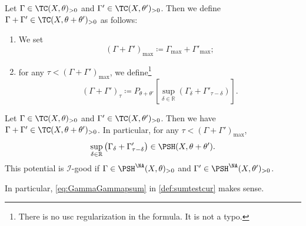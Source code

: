 \begin{definition}\label{def:sumtestcur}
    Let $\Gamma \in \TC(X,\theta)_{>0}$ and $\Gamma' \in \TC(X,\theta')_{>0}$. Then we define $\Gamma+\Gamma'\in \TC(X,\theta+\theta')_{>0}$ as follows:
    \begin{enumerate}
        \item\label{itm:def:sumtestcur:1} We set
        \[
        (\Gamma+\Gamma')_{\max}\coloneqq \Gamma_{\max}+\Gamma'_{\max};
        \]
        \item\label{itm:def:sumtestcur:2} for any $\tau<(\Gamma+\Gamma')_{\max}$, we define\footnote{There is no usc regularization in the formula. It is not a typo.}
        \begin{equation}\label{eq:GammaGammapsum}
            (\Gamma+\Gamma')_{\tau }\coloneqq P_{\theta+\theta'}\left[\sup_{\delta\in \mathbb{R}} \left(\Gamma_\delta+\Gamma'_{\tau-\delta}\right)\right].
        \end{equation}
    \end{enumerate}
\end{definition}




\begin{lemma}\label{lma:testcurvplus}
    Let $\Gamma \in \TC(X,\theta)_{>0}$ and $\Gamma' \in \TC(X,\theta')_{>0}$. Then we have $\Gamma+\Gamma'\in \TC(X,\theta+\theta')_{>0}$. In particular, for any $\tau<(\Gamma+\Gamma')_{\max}$,
    \[
    \sup_{\delta\in \mathbb{R}} \left(\Gamma_\delta+\Gamma'_{\tau-\delta}\right)\in \PSH(X,\theta+\theta').
    \]
    This potential is $\mathcal{I}$-good if $\Gamma \in \PSH^{\NA}(X,\theta)_{>0}$ and $\Gamma' \in \PSH^{\NA}(X,\theta')_{>0}$.

    In particular, \eqref{eq:GammaGammapsum} in \cref{def:sumtestcur} makes sense.
\end{lemma}

